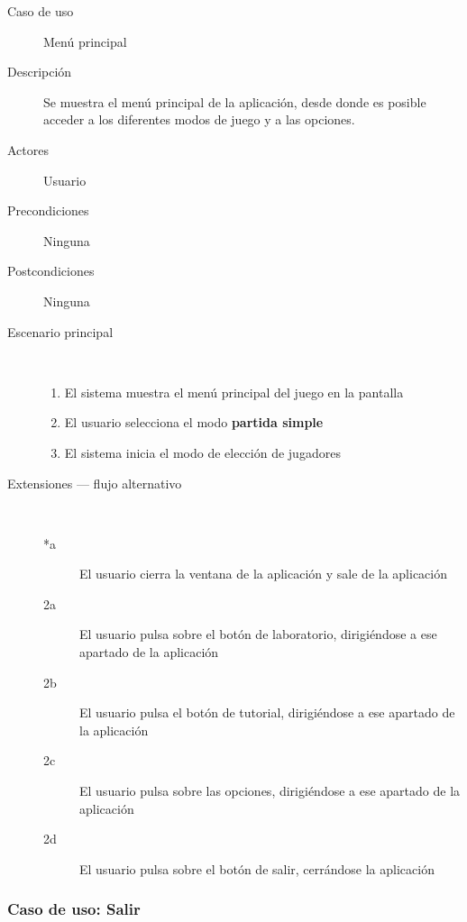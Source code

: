 \begin{description}
    \item[Caso de uso] Menú principal
    \item[Descripción] Se muestra el menú principal de la aplicación, desde donde es posible acceder a los
        diferentes modos de juego y a las opciones.
    \item[Actores] Usuario
    \item[Precondiciones] Ninguna
    \item[Postcondiciones] Ninguna
    \item[Escenario principal] $\quad$
        \begin{enumerate}
            \item El sistema muestra el menú principal del juego en la pantalla
            \item El usuario selecciona el modo \textbf{partida simple}
            \item El sistema inicia el modo de elección de jugadores
        \end{enumerate}
    \item[Extensiones --- flujo alternativo] $\quad$
        \begin{description}
            \item[*a ] El usuario cierra la ventana de la aplicación y sale de la aplicación
            \item[2a ] El usuario pulsa sobre el botón de laboratorio, dirigiéndose a ese apartado de la aplicación
            \item[2b ] El usuario pulsa el botón de tutorial, dirigiéndose a ese apartado de la aplicación
            \item[2c ] El usuario pulsa sobre las opciones, dirigiéndose a ese apartado de la aplicación
            \item[2d ] El usuario pulsa sobre el botón de salir, cerrándose la aplicación
        \end{description}
   
\end{description}

\subsubsection{Caso de uso: Salir}

